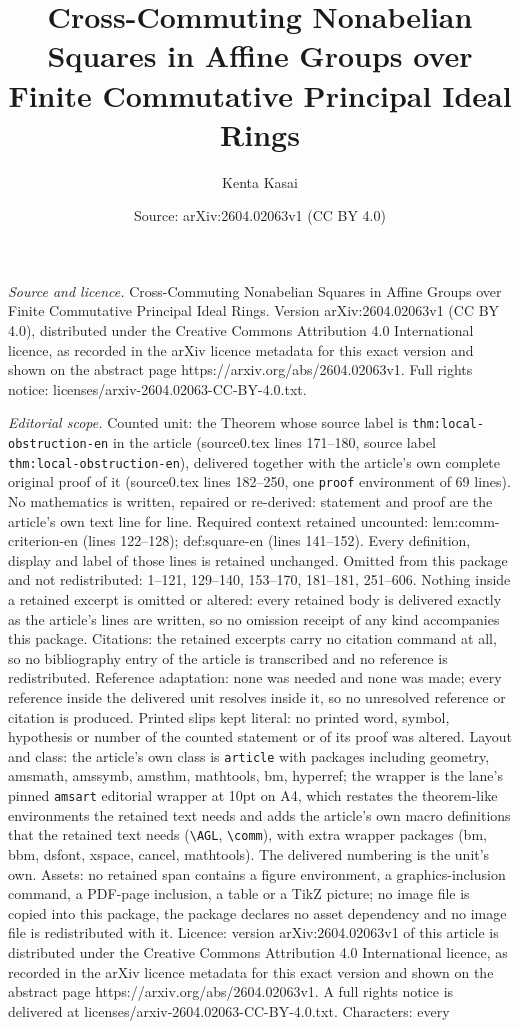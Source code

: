 \documentclass[10pt,a4paper]{amsart}
\title[Cross-Commuting Nonabelian Squares in Affine Groups over Fin]{Cross-Commuting Nonabelian Squares in Affine Groups over Finite Commutative Principal Ideal Rings}
\author{Kenta Kasai}
\date{Source: arXiv:2604.02063v1 (CC BY 4.0)}
\begin{document}
\maketitle

\noindent\emph{Source and licence.} Cross-Commuting Nonabelian Squares in Affine Groups over Finite Commutative Principal Ideal Rings. Version arXiv:2604.02063v1 (CC BY 4.0), distributed under the Creative Commons Attribution 4.0 International licence, as recorded in the arXiv licence metadata for this exact version and shown on the abstract page https://arxiv.org/abs/2604.02063v1. Full rights notice: licenses/arxiv-2604.02063-CC-BY-4.0.txt.\par\smallskip

\noindent\textit{Editorial scope.} Counted unit: the Theorem whose source label is \texttt{thm:local-obstruction-en} in the article (source0.tex lines 171--180, source label \texttt{thm:local-obstruction-en}), delivered together with the article's own complete original proof of it (source0.tex lines 182--250, one \texttt{proof} environment of 69 lines). No mathematics is written, repaired or re-derived: statement and proof are the article's own text line for line. Required context retained uncounted: lem:comm-criterion-en (lines 122--128); def:square-en (lines 141--152). Every definition, display and label of those lines is retained unchanged. Omitted from this package and not redistributed: 1--121, 129--140, 153--170, 181--181, 251--606. Nothing inside a retained excerpt is omitted or altered: every retained body is delivered exactly as the article's lines are written, so no omission receipt of any kind accompanies this package. Citations: the retained excerpts carry no citation command at all, so no bibliography entry of the article is transcribed and no reference is redistributed. Reference adaptation: none was needed and none was made; every reference inside the delivered unit resolves inside it, so no unresolved reference or citation is produced. Printed slips kept literal: no printed word, symbol, hypothesis or number of the counted statement or of its proof was altered. Layout and class: the article's own class is \texttt{article} with packages including geometry, amsmath, amssymb, amsthm, mathtools, bm, hyperref; the wrapper is the lane's pinned \texttt{amsart} editorial wrapper at 10pt on A4, which restates the theorem-like environments the retained text needs and adds the article's own macro definitions that the retained text needs (\texttt{\textbackslash AGL}, \texttt{\textbackslash comm}), with extra wrapper packages (bm, bbm, dsfont, xspace, cancel, mathtools). The delivered numbering is the unit's own. Assets: no retained span contains a figure environment, a graphics-inclusion command, a PDF-page inclusion, a table or a TikZ picture; no image file is copied into this package, the package declares no asset dependency and no image file is redistributed with it. Licence: version arXiv:2604.02063v1 of this article is distributed under the Creative Commons Attribution 4.0 International licence, as recorded in the arXiv licence metadata for this exact version and shown on the abstract page https://arxiv.org/abs/2604.02063v1. A full rights notice is delivered at licenses/arxiv-2604.02063-CC-BY-4.0.txt. Characters: every 
\end{document}
